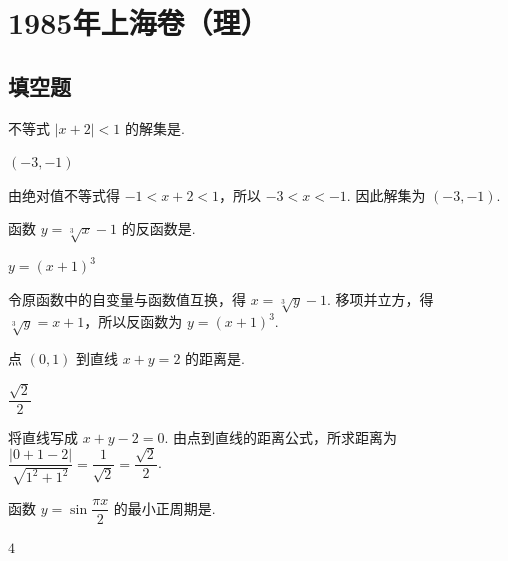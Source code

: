 \chapter{1985年上海卷（理）}

\section{填空题}

\begin{problem}

不等式 \(\left|x+2\right|<1\) 的解集是\fillinblank{}.

\begin{answer}
\(\left(-3,-1\right)\)
\end{answer}
\end{problem}

\begin{solution}
由绝对值不等式得 \(-1<x+2<1\)，所以 \(-3<x<-1\). 因此解集为 \(\left(-3,-1\right)\).
\end{solution}

\begin{problem}

函数 \(y=\sqrt[3]{x}-1\) 的反函数是\fillinblank{}.

\begin{answer}
\(y=\left(x+1\right)^3\)
\end{answer}
\end{problem}

\begin{solution}
令原函数中的自变量与函数值互换，得 \(x=\sqrt[3]{y}-1\). 移项并立方，得 \(\sqrt[3]{y}=x+1\)，所以反函数为 \(y=\left(x+1\right)^3\).
\end{solution}

\begin{problem}

点 \((0,1)\) 到直线 \(x+y=2\) 的距离是\fillinblank{}.

\begin{answer}
\(\dfrac{\sqrt{2}}{2}\)
\end{answer}
\end{problem}

\begin{solution}
将直线写成 \(x+y-2=0\). 由点到直线的距离公式，所求距离为
\(\dfrac{\left|0+1-2\right|}{\sqrt{1^2+1^2}}=\dfrac{1}{\sqrt{2}}=\dfrac{\sqrt{2}}{2}\).
\end{solution}

\begin{problem}

函数 \(y=\sin\dfrac{\pi x}{2}\) 的最小正周期是\fillinblank{}.

\begin{answer}
\(4\)
\end{answer}
\end{problem}

